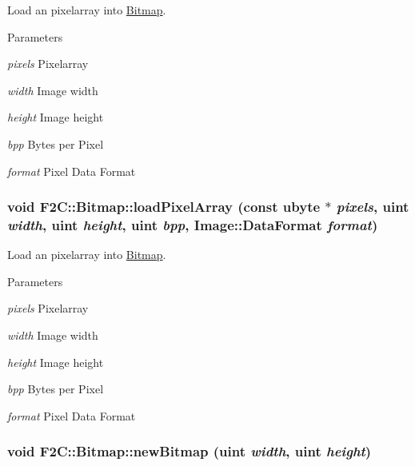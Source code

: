 Load an pixelarray into \hyperlink{class_f2_c_1_1_bitmap}{Bitmap}. 
\begin{DoxyParams}{Parameters}
\item[{\em pixels}]Pixelarray \item[{\em width}]Image width \item[{\em height}]Image height \item[{\em bpp}]Bytes per Pixel \item[{\em format}]Pixel Data Format \end{DoxyParams}
\hypertarget{class_f2_c_1_1_bitmap_ad8854f706211292b72ee7ab29f50367f}{
\subsubsection[{loadPixelArray}]{\setlength{\rightskip}{0pt plus 5cm}void F2C::Bitmap::loadPixelArray (const {\bf ubyte} $\ast$ {\em pixels}, \/  {\bf uint} {\em width}, \/  {\bf uint} {\em height}, \/  {\bf uint} {\em bpp}, \/  Image::DataFormat {\em format})}}
\label{class_f2_c_1_1_bitmap_ad8854f706211292b72ee7ab29f50367f}


Load an pixelarray into \hyperlink{class_f2_c_1_1_bitmap}{Bitmap}. 
\begin{DoxyParams}{Parameters}
\item[{\em pixels}]Pixelarray \item[{\em width}]Image width \item[{\em height}]Image height \item[{\em bpp}]Bytes per Pixel \item[{\em format}]Pixel Data Format \end{DoxyParams}
\hypertarget{class_f2_c_1_1_bitmap_aaec3a71bd846e0570c62d34bd2d4b80c}{
\subsubsection[{newBitmap}]{\setlength{\rightskip}{0pt plus 5cm}void F2C::Bitmap::newBitmap ({\bf uint} {\em width}, \/  {\bf uint} {\em height})}}
\label{class_f2_c_1_1_bitmap_aaec3a71bd846e0570c62d34bd2d4b80c}


